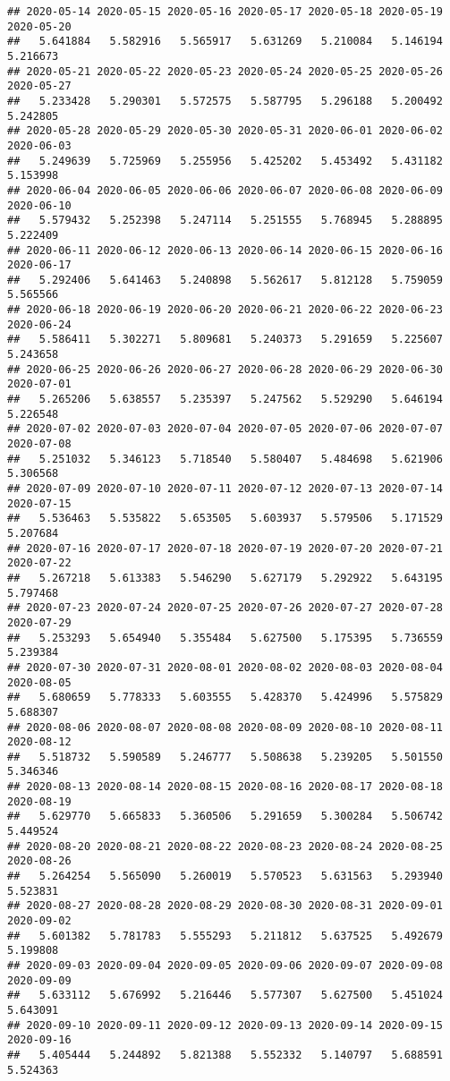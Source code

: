 \documentclass[
]{article}
\begin{document}
\begin{verbatim}
## 2020-05-14 2020-05-15 2020-05-16 2020-05-17 2020-05-18 2020-05-19 2020-05-20 
##   5.641884   5.582916   5.565917   5.631269   5.210084   5.146194   5.216673 
## 2020-05-21 2020-05-22 2020-05-23 2020-05-24 2020-05-25 2020-05-26 2020-05-27 
##   5.233428   5.290301   5.572575   5.587795   5.296188   5.200492   5.242805 
## 2020-05-28 2020-05-29 2020-05-30 2020-05-31 2020-06-01 2020-06-02 2020-06-03 
##   5.249639   5.725969   5.255956   5.425202   5.453492   5.431182   5.153998 
## 2020-06-04 2020-06-05 2020-06-06 2020-06-07 2020-06-08 2020-06-09 2020-06-10 
##   5.579432   5.252398   5.247114   5.251555   5.768945   5.288895   5.222409 
## 2020-06-11 2020-06-12 2020-06-13 2020-06-14 2020-06-15 2020-06-16 2020-06-17 
##   5.292406   5.641463   5.240898   5.562617   5.812128   5.759059   5.565566 
## 2020-06-18 2020-06-19 2020-06-20 2020-06-21 2020-06-22 2020-06-23 2020-06-24 
##   5.586411   5.302271   5.809681   5.240373   5.291659   5.225607   5.243658 
## 2020-06-25 2020-06-26 2020-06-27 2020-06-28 2020-06-29 2020-06-30 2020-07-01 
##   5.265206   5.638557   5.235397   5.247562   5.529290   5.646194   5.226548 
## 2020-07-02 2020-07-03 2020-07-04 2020-07-05 2020-07-06 2020-07-07 2020-07-08 
##   5.251032   5.346123   5.718540   5.580407   5.484698   5.621906   5.306568 
## 2020-07-09 2020-07-10 2020-07-11 2020-07-12 2020-07-13 2020-07-14 2020-07-15 
##   5.536463   5.535822   5.653505   5.603937   5.579506   5.171529   5.207684 
## 2020-07-16 2020-07-17 2020-07-18 2020-07-19 2020-07-20 2020-07-21 2020-07-22 
##   5.267218   5.613383   5.546290   5.627179   5.292922   5.643195   5.797468 
## 2020-07-23 2020-07-24 2020-07-25 2020-07-26 2020-07-27 2020-07-28 2020-07-29 
##   5.253293   5.654940   5.355484   5.627500   5.175395   5.736559   5.239384 
## 2020-07-30 2020-07-31 2020-08-01 2020-08-02 2020-08-03 2020-08-04 2020-08-05 
##   5.680659   5.778333   5.603555   5.428370   5.424996   5.575829   5.688307 
## 2020-08-06 2020-08-07 2020-08-08 2020-08-09 2020-08-10 2020-08-11 2020-08-12 
##   5.518732   5.590589   5.246777   5.508638   5.239205   5.501550   5.346346 
## 2020-08-13 2020-08-14 2020-08-15 2020-08-16 2020-08-17 2020-08-18 2020-08-19 
##   5.629770   5.665833   5.360506   5.291659   5.300284   5.506742   5.449524 
## 2020-08-20 2020-08-21 2020-08-22 2020-08-23 2020-08-24 2020-08-25 2020-08-26 
##   5.264254   5.565090   5.260019   5.570523   5.631563   5.293940   5.523831 
## 2020-08-27 2020-08-28 2020-08-29 2020-08-30 2020-08-31 2020-09-01 2020-09-02 
##   5.601382   5.781783   5.555293   5.211812   5.637525   5.492679   5.199808 
## 2020-09-03 2020-09-04 2020-09-05 2020-09-06 2020-09-07 2020-09-08 2020-09-09 
##   5.633112   5.676992   5.216446   5.577307   5.627500   5.451024   5.643091 
## 2020-09-10 2020-09-11 2020-09-12 2020-09-13 2020-09-14 2020-09-15 2020-09-16 
##   5.405444   5.244892   5.821388   5.552332   5.140797   5.688591   5.524363
\end{verbatim}
\end{document}
